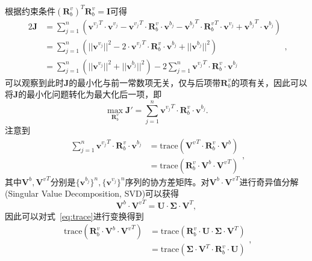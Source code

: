 根据约束条件${(\symbf{R}_{b}^{v})}^T \symbf{R}_{b}^{v} = \symbf{I}$可得
\begin{equation}
\begin{aligned}
  2\symbf{J} &= \sum_{j=1}^{n} ({\symbf{v}^{v_{j}}}^T \cdot \symbf{v}^{v_{j}} - {\symbf{v}^{v_{j}}}^T \cdot \symbf{R}_{b}^{v} \cdot \symbf{v}^{b_{j}} - {\symbf{v}^{b_{j}}}^T \cdot {\symbf{R}_{b}^{v}}^T \cdot {\symbf{v}^{v_{j}}} + {\symbf{v}^{b_{j}}}^T \cdot \symbf{v}^{b_{j}}) \\ 
  &= \sum_{j=1}^{n} (|| \symbf{v}^{v_{j}} ||^2 - 2\cdot {\symbf{v}^{v_{j}}}^T \cdot \symbf{R}_{b}^{v} \cdot \symbf{v}^{b_{j}} + || \symbf{v}^{b_{j}} ||^2) \\
  &= \sum_{j=1}^{n} (|| \symbf{v}^{v_{j}} ||^2 + || \symbf{v}^{b_{j}} ||^2) - 2 \sum_{j=1}^{n} {\symbf{v}^{v_{j}}}^T \cdot \symbf{R}_{b}^{v} \cdot \symbf{v}^{b_{j}}
\end{aligned},
\end{equation}
可以观察到此时$\symbf{J}$的最小化与前一常数项无关，仅与后项带$\symbf{R}_b^v$的项有关，因此可以将$\symbf{J}$的最小化问题转化为最大化后一项，即
\begin{equation}
  \max_{\symbf{R}_{b}^{v}} \symbf{J}' = \sum_{j=1}^{n} {\symbf{v}^{v_{j}}}^T \cdot \symbf{R}_{b}^{v} \cdot \symbf{v}^{b_{j}}.
\label{eq:max}
\end{equation}
注意到
\begin{equation}
\begin{aligned}
  \sum_{j=1}^{n} {\symbf{v}^{v_{j}}}^T \cdot \symbf{R}_{b}^{v} \cdot \symbf{v}^{b_{j}} &= \text{trace}({\symbf{V}^{v}}^T \cdot \symbf{R}_{b}^{v} \cdot \symbf{V}^{b}) \\ 
  &= \text{trace}( \symbf{R}_{b}^{v} \cdot \symbf{V}^{b} \cdot {\symbf{V}^{v}}^T)
\end{aligned},
\label{eq:trace}
\end{equation}
其中$\symbf{V}^{b}, {\symbf{V}^{v}}^T$分别是$\{\symbf{v}^{b_{j}}\}^n,\{\symbf{v}^{v_{j}}\}^n$序列的协方差矩阵。对$\symbf{V}^{b} \cdot {\symbf{V}^{v}}^T$进行奇异值分解(Singular Value Decomposition, SVD)可以获得
\begin{equation}
  \symbf{V}^{b} \cdot {\symbf{V}^{v}}^T = \symbf{U} \cdot \symbf{\Sigma} \cdot \symbf{V}^T,
\end{equation}
因此可以对式~\ref{eq:trace}进行变换得到
\begin{equation}
\begin{aligned}
  \text{trace}( \symbf{R}_{b}^{v} \cdot \symbf{V}^{b} \cdot {\symbf{V}^{v}}^T) &= \text{trace}(\symbf{R}_{b}^{v} \cdot \symbf{U} \cdot \symbf{\Sigma} \cdot \symbf{V}^T) \\
  &= \text{trace}(\symbf{\Sigma} \cdot \symbf{V}^T \cdot \symbf{R}_{b}^{v} \cdot \symbf{U})
\end{aligned},
\label{eq:svd}
\end{equation}
